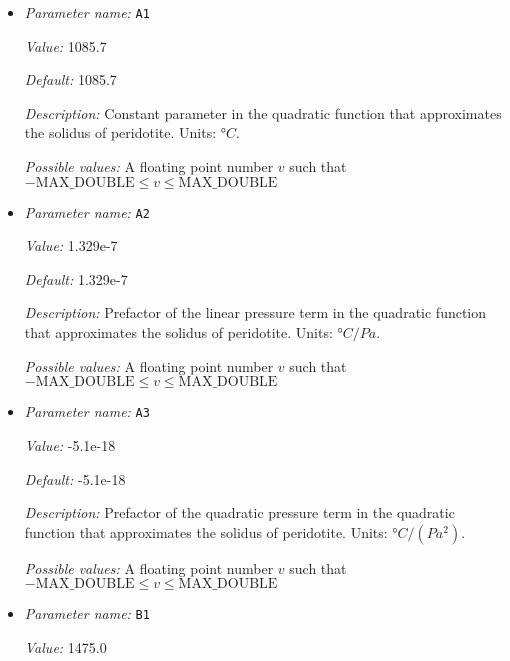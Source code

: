 \begin{itemize}
\item {\it Parameter name:} {\tt A1}
\label{parameters:Material model/Latent heat melt/A1}
\label{parameters:Material_20model/Latent_20heat_20melt/A1}


{\it Value:} 1085.7


{\it Default:} 1085.7


{\it Description:} Constant parameter in the quadratic function that approximates the solidus of peridotite. Units: $°C$.


{\it Possible values:} A floating point number $v$ such that $-\text{MAX\_DOUBLE} \leq v \leq \text{MAX\_DOUBLE}$
\item {\it Parameter name:} {\tt A2}
\label{parameters:Material model/Latent heat melt/A2}
\label{parameters:Material_20model/Latent_20heat_20melt/A2}


{\it Value:} 1.329e-7


{\it Default:} 1.329e-7


{\it Description:} Prefactor of the linear pressure term in the quadratic function that approximates the solidus of peridotite. Units: $°C/Pa$.


{\it Possible values:} A floating point number $v$ such that $-\text{MAX\_DOUBLE} \leq v \leq \text{MAX\_DOUBLE}$
\item {\it Parameter name:} {\tt A3}
\label{parameters:Material model/Latent heat melt/A3}
\label{parameters:Material_20model/Latent_20heat_20melt/A3}


{\it Value:} -5.1e-18


{\it Default:} -5.1e-18


{\it Description:} Prefactor of the quadratic pressure term in the quadratic function that approximates the solidus of peridotite. Units: $°C/(Pa^2)$.


{\it Possible values:} A floating point number $v$ such that $-\text{MAX\_DOUBLE} \leq v \leq \text{MAX\_DOUBLE}$
\item {\it Parameter name:} {\tt B1}
\label{parameters:Material model/Latent heat melt/B1}
\label{parameters:Material_20model/Latent_20heat_20melt/B1}


{\it Value:} 1475.0



\end{itemize}
